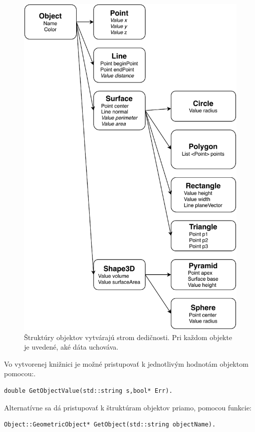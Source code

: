 \begin{figure}[]
	\centering
	\includegraphics[height=0.95\textheight]{obrazky-figures/Diagram/Draw/Parametric Sctructures Tree.pdf}
	\caption{Štruktúry objektov vytvárajú strom dedičnosti. Pri každom objekte je uvedené, aké dáta uchováva. }
	\label{fig:StromDedicnosti}
\end{figure}
Vo vytvorenej knižnici je možné pristupovať k jednotlivým hodnotám objektom pomocou:.    
\begin{lstlisting}
double GetObjectValue(std::string s,bool* Err).
\end{lstlisting}
Alternatívne sa dá pristupovať k štruktúram objektov priamo, pomocou funkcie: 
\begin{lstlisting}
Object::GeometricObject* GetObject(std::string objectName).
\end{lstlisting}

